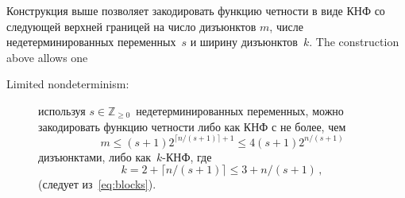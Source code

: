 Конструкция выше позволяет закодировать функцию четности в виде КНФ со следующей верхней границей на число дизъюнктов $m$, числе недетерминированных переменных~$s$ и ширину дизъюнктов~$k$.
The construction above 
allows one 
\begin{description}
	\item[Limited nondeterminism:] используя $s \in \mathbb{Z}_{\ge 0}$~недетерминированных переменных, можно закодировать функцию четности либо
	как КНФ с не более, чем 
	\begin{equation}\label{eq:upperm}
		m \le (s+1)2^{\lceil n/(s+1) \rceil+1} \le 4(s+1)2^{n/(s+1)}
	\end{equation}
	дизъюнктами, либо как~$k$-КНФ, где
	\begin{equation}\label{eq:upperk}
		k=2+{\lceil n/(s+1) \rceil} \le 3+n/(s+1) \, ,
	\end{equation}
	(следует из~\eqref{eq:blocks}).
	
\end{description}